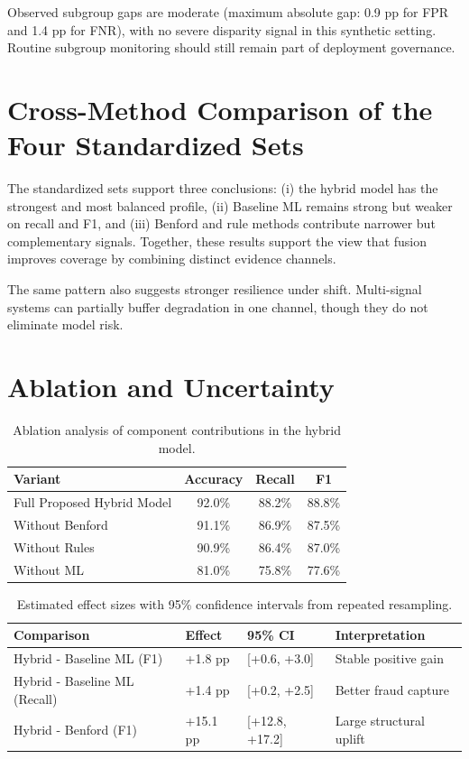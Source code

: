 \documentclass[12pt,a4paper]{report}
\begin{document}
Observed subgroup gaps are moderate (maximum absolute gap: 0.9 pp for FPR and 1.4 pp for FNR), with no severe disparity signal in this synthetic setting. Routine subgroup monitoring should still remain part of deployment governance.

\section{Cross-Method Comparison of the Four Standardized Sets}
The standardized sets support three conclusions: (i) the hybrid model has the strongest and most balanced profile, (ii) Baseline ML remains strong but weaker on recall and F1, and (iii) Benford and rule methods contribute narrower but complementary signals. Together, these results support the view that fusion improves coverage by combining distinct evidence channels.

The same pattern also suggests stronger resilience under shift. Multi-signal systems can partially buffer degradation in one channel, though they do not eliminate model risk.

\section{Ablation and Uncertainty}
\begin{table}[H]
\caption{Ablation analysis of component contributions in the hybrid model.}
\label{tab:ablation}
\begin{tabular}{lccc}
\toprule
\textbf{Variant} & \textbf{Accuracy} & \textbf{Recall} & \textbf{F1} \\
\midrule
Full Proposed Hybrid Model & 92.0\% & 88.2\% & 88.8\% \\
Without Benford & 91.1\% & 86.9\% & 87.5\% \\
Without Rules & 90.9\% & 86.4\% & 87.0\% \\
Without ML & 81.0\% & 75.8\% & 77.6\% \\
\bottomrule
\end{tabular}
\end{table}

\begin{table}[H]
\caption{Estimated effect sizes with 95\% confidence intervals from repeated resampling.}
\label{tab:uncertainty}
\begin{tabular}{p{}p{}p{}p{}}
\toprule
\textbf{Comparison} & \textbf{Effect} & \textbf{95\% CI} & \textbf{Interpretation} \\
\midrule
Hybrid - Baseline ML (F1) & +1.8 pp & [+0.6, +3.0] & Stable positive gain \\
Hybrid - Baseline ML (Recall) & +1.4 pp & [+0.2, +2.5] & Better fraud capture \\
Hybrid - Benford (F1) & +15.1 pp & [+12.8, +17.2] & Large structural uplift \\
\bottomrule
\end{tabular}
\end{table}
\end{document}
